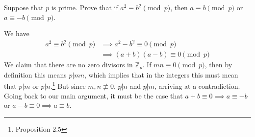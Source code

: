   \begin{exercise}[Shifrin 1.3.12]
    Suppose that $p$ is prime. Prove that if $a^2 \equiv b^2 \pmod{p}$, then $a \equiv b \pmod{p}$ or $a \equiv -b \pmod{p}$. 
  \end{exercise}
  \begin{solution}
    We have 
    \begin{align}
      a^2 \equiv b^2 \pmod{p} & \implies a^2 - b^2 \equiv 0 \pmod{p} \\
                              & \implies (a + b) (a - b) \equiv 0 \pmod{p}
    \end{align} 
    We claim that there are no zero divisors in $\mathbb{Z}_p$. If $mn \equiv 0 \pmod{p}$, then by definition this means $p | mn$, which implies that in the integers this must mean that $p | m$ or $p | n$.\footnote{Proposition 2.5} But since $m, n \not\equiv 0$, $p \not| n$ and $p \not| m$, arriving at a contradiction. Going back to our main argument, it must be the case that $a + b \equiv 0 \implies a \equiv -b$ or $a - b \equiv 0 \implies a \equiv b$.  
  \end{solution}

